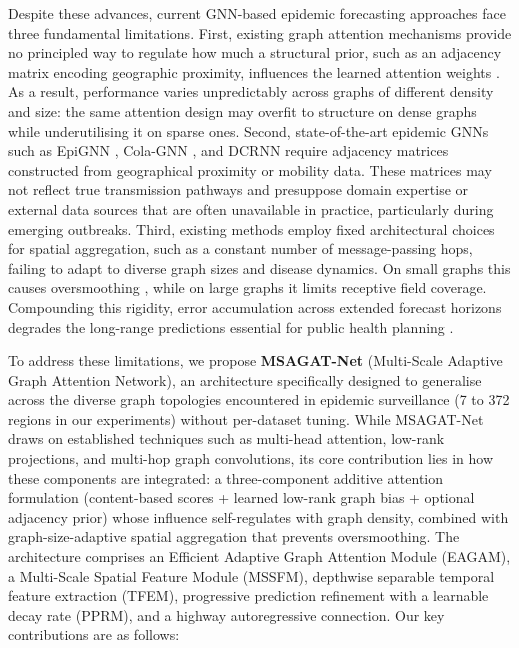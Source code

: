 \documentclass[a4paper,fleqn]{cas-dc}
\begin{document}
Despite these advances, current GNN-based epidemic forecasting approaches face three fundamental limitations. First, existing graph attention mechanisms provide no principled way to regulate how much a structural prior, such as an adjacency matrix encoding geographic proximity, influences the learned attention weights \cite{velickovic2017graph}. As a result, performance varies unpredictably across graphs of different density and size: the same attention design may overfit to structure on dense graphs while underutilising it on sparse ones. Second, state-of-the-art epidemic GNNs such as EpiGNN \cite{xie2022epignn}, Cola-GNN \cite{dengColaGNNCrosslocationAttention2020a}, and DCRNN \cite{li2017diffusion} require adjacency matrices constructed from geographical proximity or mobility data. These matrices may not reflect true transmission pathways and presuppose domain expertise or external data sources that are often unavailable in practice, particularly during emerging outbreaks. Third, existing methods employ fixed architectural choices for spatial aggregation, such as a constant number of message-passing hops, failing to adapt to diverse graph sizes and disease dynamics. On small graphs this causes oversmoothing \cite{li2018deeper}, while on large graphs it limits receptive field coverage. Compounding this rigidity, error accumulation across extended forecast horizons degrades the long-range predictions essential for public health planning \cite{Brooks2018Nonmechanistic}.

To address these limitations, we propose \textbf{MSAGAT-Net} (Multi-Scale Adaptive Graph Attention Network), an architecture specifically designed to generalise across the diverse graph topologies encountered in epidemic surveillance (7 to 372 regions in our experiments) without per-dataset tuning. While MSAGAT-Net draws on established techniques such as multi-head attention, low-rank projections, and multi-hop graph convolutions, its core contribution lies in how these components are integrated: a three-component additive attention formulation (content-based scores + learned low-rank graph bias + optional adjacency prior) whose influence self-regulates with graph density, combined with graph-size-adaptive spatial aggregation that prevents oversmoothing. The architecture comprises an Efficient Adaptive Graph Attention Module (EAGAM), a Multi-Scale Spatial Feature Module (MSSFM), depthwise separable temporal feature extraction (TFEM), progressive prediction refinement with a learnable decay rate (PPRM), and a highway autoregressive connection. Our key contributions are as follows:
\end{document}
